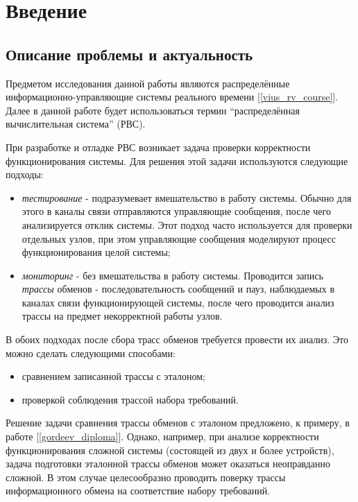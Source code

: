 \section{Введение}

\subsection{Описание проблемы и актуальность}

Предметом исследования данной работы являются распределённые 
информационно-управляющие системы реального времени [\ref{vius_rv_course}]. 
Далее в данной работе будет использоваться термин ``распределённая 
вычислительная система'' (РВС).

При разработке и отладке РВС возникает задача проверки корректности 
функционирования системы. Для решения этой задачи используются следующие 
подходы:

\begin{itemize}
 \item \textit{тестирование} - подразумевает вмешательство в работу системы. 
Обычно для этого в каналы связи отправляются управляющие сообщения, 
после чего анализируется отклик системы. Этот подход часто используется для 
проверки отдельных узлов, при этом управляющие сообщения моделируют 
процесс функционирования целой системы;
 \item \textit{мониторинг} - без вмешательства в работу системы. Проводится 
запись \textit{трассы} обменов - последовательность сообщений и пауз, 
наблюдаемых в каналах связи функционирующей системы, после чего проводится 
анализ трассы на предмет некорректной работы узлов.
\end{itemize}

В обоих подходах после сбора трасс обменов требуется провести их анализ. Это 
можно сделать следующими способами:

\begin{itemize}
 \item сравнением записанной трассы с эталоном;
 \item проверкой соблюдения трассой набора требований.
\end{itemize}

Решение задачи сравнения трассы обменов с эталоном предложено, к примеру, в 
работе [\ref{gordeev_diploma}]. Однако, например, при анализе корректности 
функционирования сложной системы (состоящей из двух и более устройств), 
задача подготовки эталонной трассы обменов может оказаться неоправданно 
сложной. В этом случае целесообразно проводить поверку трассы 
информационного обмена на соответствие набору требований.

